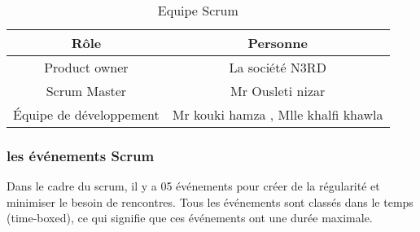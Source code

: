 \begin{table} [!ht]
	\centering
	\begin{tabular} {|c|c|}\hline
		Rôle & Personne \\  \hline
		Product owner     & La société N3RD      \\    \hline
		Scrum Master     & Mr Ousleti nizar    \\    \hline
		Équipe de développement    &  Mr kouki hamza ,
		Mlle khalfi khawla     \\    \hline	
		
	\end{tabular}
	\caption{Equipe Scrum}\label{tab: first-table}	
\end{table}
\clearpage
\subsubsection{les événements Scrum}
Dans le cadre du scrum, il y a 05 événements pour créer de la régularité et minimiser le besoin de rencontres. Tous les événements sont classés dans le temps (time-boxed), ce qui signifie que ces événements ont une durée maximale.
